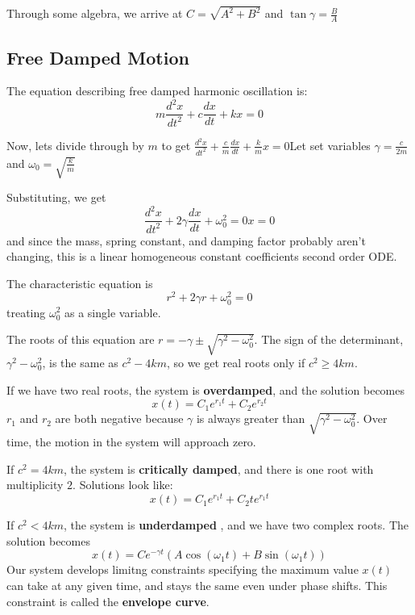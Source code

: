 \documentclass{article}
\begin{document}
Through some algebra, we arrive at $C = \sqrt{A^2 + B^2}$ and $\tan\gamma = \frac{B}{A}$

\subsection{Free Damped Motion}

\begin{definition}
The equation describing free damped harmonic oscillation is:
$$m\frac{d^2x}{dt^2} + c\frac{dx}{dt} + kx = 0$$
\end{definition}

Now, lets divide through by $m$ to get $\frac{d^2x}{dt^2} + \frac{c}{m} \frac{dx}{dt} + \frac{k}{m} x = 0$Let set variables $\gamma = \frac{c}{2m}$ and $\omega_0 = \sqrt{\frac{k}{m}}$

Substituting, we get $$\frac{d^2x}{dt^2} + 2\gamma \frac{dx}{dt} + \omega_0^2 = 0x = 0$$and since the mass, spring constant, and damping factor probably aren't changing, this is a linear homogeneous constant coefficients second order ODE.

The characteristic equation is $$r^2 + 2\gamma r + \omega_0^2 = 0$$treating $\omega_0^2$ as a single variable.

The roots of this equation are $r = -\gamma\pm\sqrt{\gamma^2-\omega_0^2}$. The sign of the determinant, $\gamma^2 - \omega_0^2$, is the same as $c^2 - 4km$, so we get real roots only if $c^2 \geq 4km$.

\begin{definition}[Overdamping]
If we have two real roots, the system is \textbf{overdamped}, and the solution becomes $$x(t) = C_1e^{r_1t} + C_2e^{r_2t}$$$r_1$ and $r_2$ are both negative because $\gamma$ is always greater than $\sqrt{\gamma^2 - \omega_0^2}$. Over time, the motion in the system will approach zero. 
\end{definition}

\begin{definition}
If $c^2 = 4km$, the system is \textbf{critically damped}, and there is one root with multiplicity $2$. Solutions look like:$$x(t) = C_1e^{r_1t} + C_2te^{r_1t}$$
\end{definition}

\begin{definition}[Underdamped]
If $c^2 < 4km$, the system is \textbf{underdamped}  , and we have two complex roots. The solution becomes $$x(t) = Ce^{-\gamma t}(A\cos(\omega_1 t) + B\sin(\omega_1 t))$$Our system develops limitng constraints specifying the maximum value $x(t)$ can take at any given time, and stays the same even under phase shifts. This constraint is called the \textbf{envelope curve}. 
\end{definition}
\end{document}
